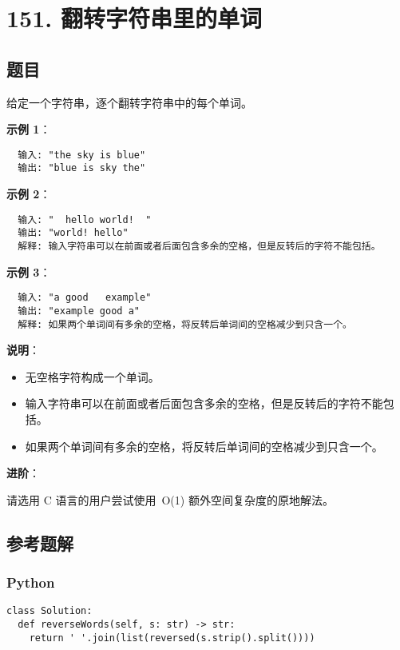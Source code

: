 \newpage
\section{151. 翻转字符串里的单词}
\label{leetcode:151}

\subsection{题目}

给定一个字符串，逐个翻转字符串中的每个单词。

\textbf{示例 1}：

\begin{verbatim}
  输入: "the sky is blue"
  输出: "blue is sky the"
\end{verbatim}

\textbf{示例 2}：

\begin{verbatim}
  输入: "  hello world!  "
  输出: "world! hello"
  解释: 输入字符串可以在前面或者后面包含多余的空格，但是反转后的字符不能包括。
\end{verbatim}

\textbf{示例 3}：

\begin{verbatim}
  输入: "a good   example"
  输出: "example good a"
  解释: 如果两个单词间有多余的空格，将反转后单词间的空格减少到只含一个。
\end{verbatim}

\textbf{说明}：

\begin{itemize}
  \item 无空格字符构成一个单词。
  \item 输入字符串可以在前面或者后面包含多余的空格，但是反转后的字符不能包括。
  \item 如果两个单词间有多余的空格，将反转后单词间的空格减少到只含一个。
\end{itemize}

\textbf{进阶}：

请选用 C 语言的用户尝试使用 O(1) 额外空间复杂度的原地解法。

\subsection{参考题解}

\subsubsection{Python}

\begin{verbatim}
class Solution:
  def reverseWords(self, s: str) -> str:
    return ' '.join(list(reversed(s.strip().split())))
\end{verbatim}
